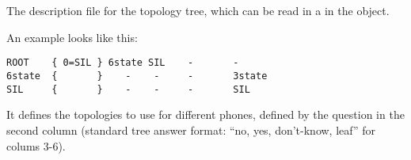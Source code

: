 
\section{}

The description file for the topology tree, which can be read in a
in the  object.

An example looks like this:

\begin{verbatim}
ROOT    { 0=SIL } 6state SIL    -       -
6state  {       }    -    -     -       3state
SIL     {       }    -    -     -       SIL
\end{verbatim}

It defines the topologies to use for different phones, defined by the
question in the second column (standard tree answer format: ``no, yes,
don't-know, leaf'' for colums 3-6).

